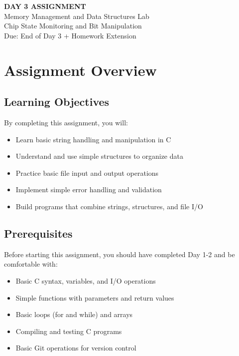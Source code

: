 \documentclass[11pt,a4paper]{article}
\begin{document}
\begin{center}
    {\Huge\bfseries\color{codeblue} DAY 3 ASSIGNMENT}\\[0.5cm]
    {\Large Memory Management and Data Structures Lab}\\[0.3cm]
    {\large Chip State Monitoring and Bit Manipulation}\\[0.2cm]
    {\normalsize Due: End of Day 3 + Homework Extension}
\end{center}

\vspace{1cm}

\section{Assignment Overview}

\subsection{Learning Objectives}
By completing this assignment, you will:
\begin{itemize}
    \item Learn basic string handling and manipulation in C
    \item Understand and use simple structures to organize data
    \item Practice basic file input and output operations
    \item Implement simple error handling and validation
    \item Build programs that combine strings, structures, and file I/O
\end{itemize}

\subsection{Prerequisites}
Before starting this assignment, you should have completed Day 1-2 and be comfortable with:
\begin{itemize}
    \item Basic C syntax, variables, and I/O operations
    \item Simple functions with parameters and return values
    \item Basic loops (for and while) and arrays
    \item Compiling and testing C programs
    \item Basic Git operations for version control
\end{itemize}
\end{document}
